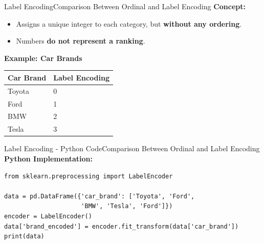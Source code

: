 \documentclass[11pt]{beamer}
\begin{document}
\begin{frame}{Label Encoding}{Comparison Between Ordinal and Label Encoding}
    \textbf{Concept:}
    \begin{itemize}
        \item Assigns a unique integer to each category, but \textbf{without any ordering}.
        \item Numbers \textbf{do not represent a ranking}.
    \end{itemize}
    \vspace{0.3cm}
    \textbf{Example: Car Brands}
    \begin{table}[]
        \centering
        \begin{tabular}{ll}
            \toprule
            \textbf{Car Brand} & \textbf{Label Encoding} \\
            \midrule
            Toyota & 0 \\
            Ford   & 1 \\
            BMW    & 2 \\
            Tesla  & 3 \\
            \bottomrule
        \end{tabular}
    \end{table}
\end{frame}
%
%
\begin{frame}[fragile]{Label Encoding - Python Code}{Comparison Between Ordinal and Label Encoding}
    \textbf{Python Implementation:}
    \footnotesize{
    \begin{verbatim}
from sklearn.preprocessing import LabelEncoder

data = pd.DataFrame({'car_brand': ['Toyota', 'Ford', 
                     'BMW', 'Tesla', 'Ford']})
encoder = LabelEncoder()
data['brand_encoded'] = encoder.fit_transform(data['car_brand'])
print(data)
    \end{verbatim}
}
\end{frame}
%
%
\end{document}
